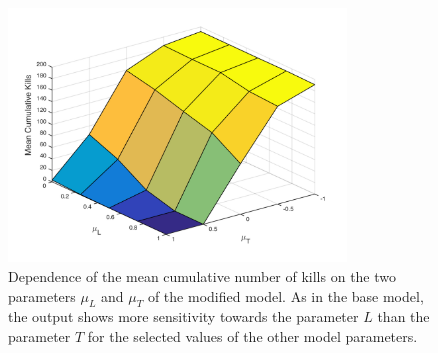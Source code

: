 \documentclass[11pt]{article}
\begin{document}
\begin{figure}[!htbp]
	\centering
		\includegraphics[width=0.80\textwidth]{../../code/modified_model/L_T_mean_dep_mean.png}
	\caption{Dependence of the mean cumulative number of kills on the two parameters $\mu_L$ and $\mu_T$ of the modified model. As in the base model, the output shows more sensitivity towards the parameter $L$ than the parameter $T$ for the selected values of the other model parameters.}
	\label{fig:L_T_dep_mod}
\end{figure}
\end{document}
